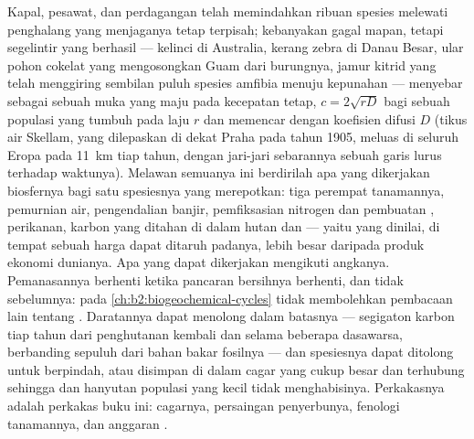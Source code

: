 \begin{proposition}\label{prop:b2:global-change:invasion}
Kapal, pesawat, dan perdagangan telah memindahkan ribuan spesies
melewati penghalang yang menjaganya tetap terpisah; kebanyakan gagal
mapan, tetapi segelintir yang berhasil --- kelinci di Australia,
kerang zebra di Danau Besar, ular pohon cokelat yang mengosongkan Guam
dari burungnya, jamur kitrid yang telah menggiring sembilan puluh
spesies amfibia menuju kepunahan --- menyebar sebagai sebuah muka yang
maju pada kecepatan tetap, $c =
2\sqrt{rD}$ bagi sebuah populasi yang
tumbuh pada laju $r$ dan memencar dengan koefisien difusi $D$ (tikus
air Skellam, yang dilepaskan di dekat Praha pada tahun 1905, meluas di
seluruh Eropa pada \qty{11}{km} tiap tahun, dengan jari-jari sebarannya
sebuah garis lurus terhadap waktunya). Melawan semuanya ini berdirilah
apa yang dikerjakan biosfernya bagi satu spesiesnya yang merepotkan:
 tiga perempat tanamannya, pemurnian air, pengendalian
banjir, pemfiksasian nitrogen dan pembuatan , perikanan, karbon
yang ditahan di dalam hutan dan  --- yaitu \emph{} yang dinilai, di tempat sebuah harga dapat ditaruh padanya,
lebih besar daripada produk ekonomi dunianya. Apa yang dapat dikerjakan
mengikuti angkanya. Pemanasannya berhenti ketika pancaran bersihnya
berhenti, dan tidak sebelumnya:  pada
\cref{ch:b2:biogeochemical-cycles} tidak membolehkan pembacaan lain
tentang \emph{}. Daratannya dapat menolong dalam batasnya ---
segigaton karbon tiap tahun dari penghutanan kembali dan 
selama beberapa dasawarsa, berbanding sepuluh dari bahan bakar
fosilnya --- dan spesiesnya dapat ditolong untuk berpindah, atau
disimpan di dalam cagar yang cukup besar dan terhubung sehingga
 dan hanyutan populasi yang kecil tidak
menghabisinya. Perkakasnya adalah perkakas buku ini: 
cagarnya, persaingan penyerbunya, fenologi tanamannya, dan anggaran
.
\end{proposition}


